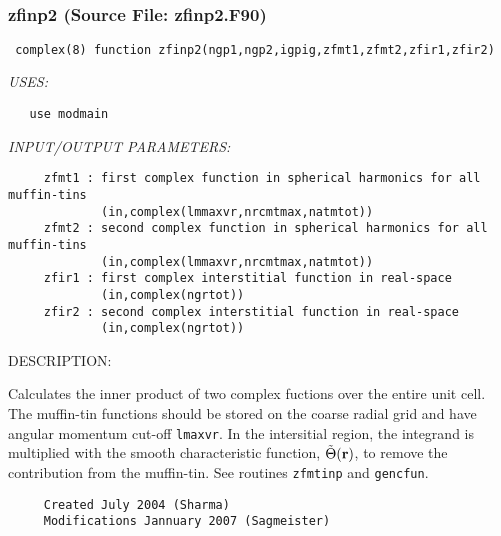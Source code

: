 \documentclass[11pt]{article}
\begin{document}
\mbox{}\hrulefill\ 
 
\subsubsection{zfinp2 (Source File: zfinp2.F90)}


\begin{verbatim} complex(8) function zfinp2(ngp1,ngp2,igpig,zfmt1,zfmt2,zfir1,zfir2)\end{verbatim}{\em USES:}
\begin{verbatim}   use modmain\end{verbatim}{\em INPUT/OUTPUT PARAMETERS:}
\begin{verbatim}     zfmt1 : first complex function in spherical harmonics for all muffin-tins
             (in,complex(lmmaxvr,nrcmtmax,natmtot))
     zfmt2 : second complex function in spherical harmonics for all muffin-tins
             (in,complex(lmmaxvr,nrcmtmax,natmtot))
     zfir1 : first complex interstitial function in real-space
             (in,complex(ngrtot))
     zfir2 : second complex interstitial function in real-space
             (in,complex(ngrtot))\end{verbatim}
{\sf DESCRIPTION:\\ }


     Calculates the inner product of two complex fuctions over the entire unit
     cell. The muffin-tin functions should be stored on the coarse radial grid
     and have angular momentum cut-off {\tt lmaxvr}. In the intersitial region,
     the integrand is multiplied with the smooth characteristic function,
     $\tilde{\Theta}({\bf r})$, to remove the contribution from the muffin-tin.
     See routines {\tt zfmtinp} and {\tt gencfun}.
  
\begin{verbatim}     Created July 2004 (Sharma)
     Modifications Jannuary 2007 (Sagmeister)\end{verbatim}

\end{document}
